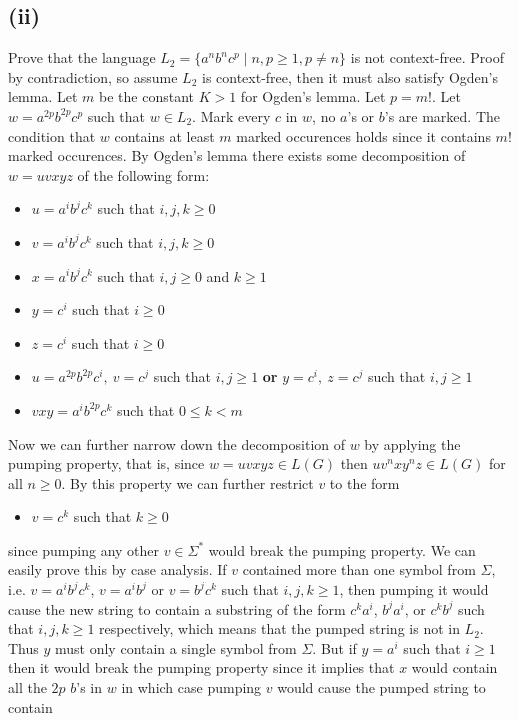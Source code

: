 \documentclass[12pt]{article}
\begin{document}
\subsection*{(ii)}Prove that the language
$L_2 = \{a^nb^nc^p \mid n,p\ge 1, p\neq n\}$ is not context-free.
\medskip \newline
Proof by contradiction, so assume $L_2$ is context-free, then it must also
satisfy Ogden's lemma. Let $m$ be the constant $K > 1$ for Ogden's lemma.
Let $p=m!$. Let $w = a^{2p}b^{2p}c^p$ such that $w \in L_2$. Mark every $c$ in
$w$, no $a$'s or $b$'s are marked. The condition that $w$ contains at least
$m$ marked occurences holds since it contains $m!$ marked occurences.
By Ogden's lemma there exists some decomposition of $w = uvxyz$ of the following
form:
\begin{itemize}
\item $u=a^ib^jc^k$ such that $i,j,k\ge 0$
\item $v=a^ib^jc^k$ such that $i,j,k\ge 0$
\item $x=a^ib^jc^k$ such that $i,j\ge 0$ and $k\ge 1$
\item $y=c^i$ such that $i\ge 0$
\item $z=c^i$ such that $i\ge 0$
\item $u=a^{2p}b^{2p}c^i,\ v=c^j$ such that $i,j\ge 1$ \textbf{or}
$y=c^i,\ z=c^j$ such that $i,j\ge 1$
\item $vxy = a^ib^{2p}c^k$ such that $0\le k<m$
\end{itemize}
Now we can further narrow down the decomposition of $w$ by applying the pumping
property, that is, since $w = uvxyz \in L(G)$ then $uv^nxy^nz \in L(G)$ for all
$n \ge 0$. By this property we can further restrict $v$ to the form
\begin{itemize}
\item $v=c^k$ such that $k\ge 0$
\end{itemize}
since pumping any other $v \in \Sigma^*$ would break the pumping property. We
can easily prove this by case analysis. If $v$ contained more than one symbol
from $\Sigma$, i.e. $v=a^ib^jc^k$, $v=a^ib^j$ or $v=b^jc^k$ such that $i,j,k\ge
1$, then pumping it would cause the new string to contain a substring of the
form $c^ka^i$, $b^ja^i$, or $c^kb^j$ such that $i,j,k\ge 1$ respectively,
which means that the pumped string is not in $L_2$. Thus $y$ must only contain
a single symbol from $\Sigma$. But if $y=a^i$ such that $i\ge 1$ then it would
break the pumping property since it implies that $x$ would contain all the $2p$
$b$'s in $w$ in which case pumping $v$ would cause the pumped string to contain
\end{document}
